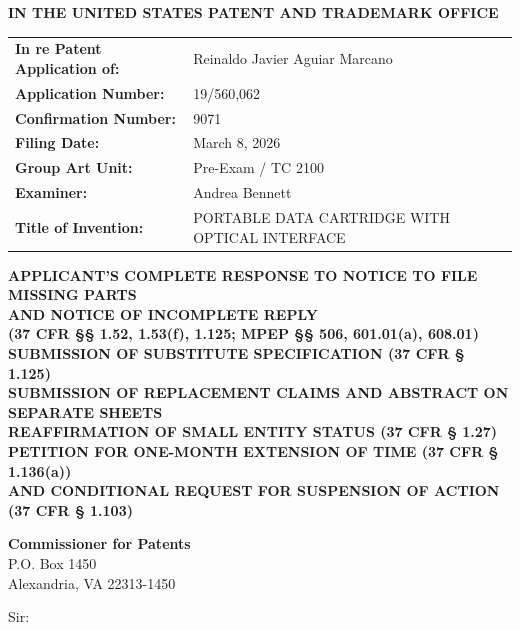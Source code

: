 \documentclass[11pt,letterpaper]{article}
\begin{document}
\thispagestyle{empty}

\begin{center}
    \large\textbf{IN THE UNITED STATES PATENT AND TRADEMARK OFFICE} \\
\end{center}

\vspace{0.3cm}
\noindent\begin{tabular}{p{2.3in}p{4.0in}}
\textbf{In re Patent Application of:} & Reinaldo Javier Aguiar Marcano \\
\textbf{Application Number:} & 19/560,062 \\
\textbf{Confirmation Number:} & 9071 \\
\textbf{Filing Date:} & March 8, 2026 \\
\textbf{Group Art Unit:} & Pre-Exam / TC 2100 \\
\textbf{Examiner:} & Andrea Bennett \\
\textbf{Title of Invention:} & PORTABLE DATA CARTRIDGE WITH OPTICAL INTERFACE \\
\end{tabular}

\vspace{0.8cm}
\begin{center}
    \textbf{\large APPLICANT'S COMPLETE RESPONSE TO NOTICE TO FILE MISSING PARTS \\
    AND NOTICE OF INCOMPLETE REPLY \\
    (37 CFR \S\S{} 1.52, 1.53(f), 1.125; MPEP \S\S{} 506, 601.01(a), 608.01) \\
    SUBMISSION OF SUBSTITUTE SPECIFICATION (37 CFR \S{} 1.125) \\
    SUBMISSION OF REPLACEMENT CLAIMS AND ABSTRACT ON SEPARATE SHEETS \\
    REAFFIRMATION OF SMALL ENTITY STATUS (37 CFR \S{} 1.27) \\
    PETITION FOR ONE-MONTH EXTENSION OF TIME (37 CFR \S{} 1.136(a)) \\
    AND CONDITIONAL REQUEST FOR SUSPENSION OF ACTION (37 CFR \S{} 1.103)}
\end{center}

\vspace{0.3cm}
\noindent\textbf{Commissioner for Patents} \\
\noindent P.O. Box 1450 \\
\noindent Alexandria, VA 22313-1450

\vspace{0.3cm}
\noindent Sir:
\end{document}
